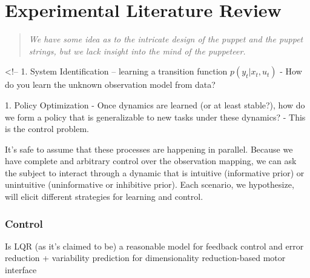 \documentclass[../main.tex]{subfiles}
\begin{document}
\chapter{Experimental Literature Review}\label{chap:bg_experimental}


\bigskip
\begin{quote}
  \emph{We have some idea as to the intricate design of the puppet and the puppet strings, but we lack insight into the mind of the puppeteer.}
\end{quote}

<!-- 1. System Identification -- learning a transition function $p(y_t|x_t, u_t)$
    - How do you learn the unknown observation model from data?

1. Policy Optimization
    - Once dynamics are learned (or at least stable?), how do we form a policy that is generalizable to new tasks under these dynamics?
    - This is the control problem.

It's safe to assume that these processes are happening in parallel. Because we have complete and arbitrary control over the observation mapping, we can ask the subject to interact through a  dynamic that is intuitive (informative prior) or unintuitive (uninformative or inhibitive prior). Each scenario, we hypothesize, will elicit different strategies for learning and control.

\subsection{Control}\label{control}

Is LQR (as it's claimed to be) a reasonable model for feedback control
and error reduction + variability prediction for dimensionality
reduction-based motor interface
\end{document}
